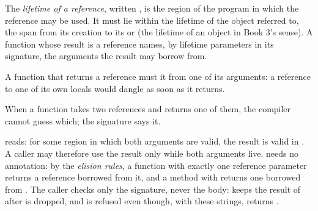 \begin{definition}\label{def:b2:rust-ownership:lifetime}
The \emph{lifetime of a reference}, written , is the region of the program in which
the reference may be used. It must lie within the lifetime of the object referred to, the span from its creation
to its  or  (the lifetime of an object in Book 3's sense). A function whose result is a reference names, by
lifetime parameters in its signature, the arguments the result may borrow from.
\end{definition}

A function that returns a reference must  it from one of its arguments: a reference to one of its own locals
would dangle as soon as it returns.

\label{out:b2:rust-ownership:dangling}

When a function takes two references and returns one of them, the compiler cannot guess which; the signature says
it.

\label{lst:b2:rust-ownership:longest}

\label{out:b2:rust-ownership:longest}

 reads: for some region  in which both arguments
are valid, the result is valid in . A caller may therefore use the result only while both arguments live.
 needs no annotation: by the \emph{elision rules}, a function with exactly one reference parameter
returns a reference borrowed from it, and a method with  returns one borrowed from . The caller
checks only the signature, never the body:  keeps the result of  after 
is dropped, and is refused even though, with these strings,  returns .

\label{out:b2:rust-ownership:longest-scope}


